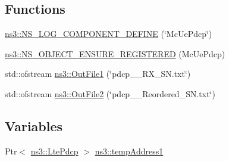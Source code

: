 \subsection*{Functions}
\begin{DoxyCompactItemize}
\item 
\hyperlink{namespacens3_a66cdd5c7334b1de8e09ef6556fa88a8c}{ns3\+::\+N\+S\+\_\+\+L\+O\+G\+\_\+\+C\+O\+M\+P\+O\+N\+E\+N\+T\+\_\+\+D\+E\+F\+I\+NE} (\char`\"{}Mc\+Ue\+Pdcp\char`\"{})
\item 
\hyperlink{namespacens3_a24b0845545f77db65da73f5b112f8290}{ns3\+::\+N\+S\+\_\+\+O\+B\+J\+E\+C\+T\+\_\+\+E\+N\+S\+U\+R\+E\+\_\+\+R\+E\+G\+I\+S\+T\+E\+R\+ED} (Mc\+Ue\+Pdcp)
\item 
std\+::ofstream \hyperlink{namespacens3_a92f6c16254f067e3247ea33a7ada3444}{ns3\+::\+Out\+File1} (\char`\"{}pdcp\+\_\+\_\+\+R\+X\+\_\+\+S\+N.\+txt\char`\"{})
\item 
std\+::ofstream \hyperlink{namespacens3_a9b97de465779b1ad6d6147991dd9cde7}{ns3\+::\+Out\+File2} (\char`\"{}pdcp\+\_\+\_\+\+Reordered\+\_\+\+S\+N.\+txt\char`\"{})
\end{DoxyCompactItemize}
\subsection*{Variables}
\begin{DoxyCompactItemize}
\item 
Ptr$<$ \hyperlink{classns3_1_1LtePdcp}{ns3\+::\+Lte\+Pdcp} $>$ \hyperlink{namespacens3_a3418b92c68e517e43eea65ebed88c7e8}{ns3\+::temp\+Address1}
\end{DoxyCompactItemize}
